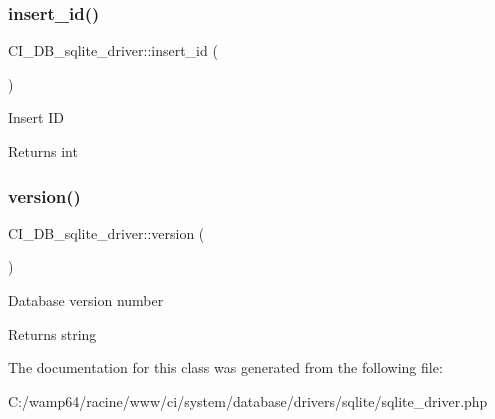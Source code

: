 \subsubsection{\texorpdfstring{insert\+\_\+id()}{insert\_id()}}
{\footnotesize\ttfamily C\+I\+\_\+\+D\+B\+\_\+sqlite\+\_\+driver\+::insert\+\_\+id (\begin{DoxyParamCaption}{ }\end{DoxyParamCaption})}

Insert ID

\begin{DoxyReturn}{Returns}
int 
\end{DoxyReturn}
\mbox{\label{class_c_i___d_b__sqlite__driver_a000bdad2689dccd84ecc4a23d392cd67}} 
\subsubsection{\texorpdfstring{version()}{version()}}
{\footnotesize\ttfamily C\+I\+\_\+\+D\+B\+\_\+sqlite\+\_\+driver\+::version (\begin{DoxyParamCaption}{ }\end{DoxyParamCaption})}

Database version number

\begin{DoxyReturn}{Returns}
string 
\end{DoxyReturn}


The documentation for this class was generated from the following file\+:\begin{DoxyCompactItemize}
\item 
C\+:/wamp64/racine/www/ci/system/database/drivers/sqlite/sqlite\+\_\+driver.\+php\end{DoxyCompactItemize}
